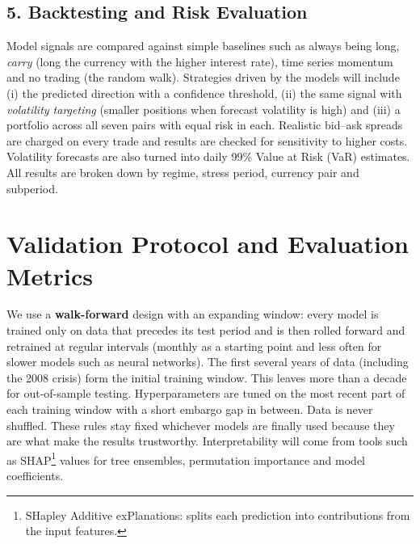 \documentclass[11pt,a4paper]{article}
\begin{document}
\subsection*{5. Backtesting and Risk Evaluation}
Model signals are compared against simple baselines such as always being long, \emph{carry} (long the currency with the higher interest rate), time series momentum and no trading (the random walk). Strategies driven by the models will include (i) the predicted direction with a confidence threshold, (ii) the same signal with \emph{volatility targeting} (smaller positions when forecast volatility is high) and (iii) a portfolio across all seven pairs with equal risk in each. Realistic bid--ask spreads are charged on every trade and results are checked for sensitivity to higher costs. Volatility forecasts are also turned into daily 99\% Value at Risk (VaR) estimates. All results are broken down by regime, stress period, currency pair and subperiod.

\section*{Validation Protocol and Evaluation Metrics}
We use a \textbf{walk-forward} design with an expanding window: every model is trained only on data that precedes its test period and is then rolled forward and retrained at regular intervals (monthly as a starting point and less often for slower models such as neural networks). The first several years of data (including the 2008 crisis) form the initial training window. This leaves more than a decade for out-of-sample testing.
Hyperparameters are tuned on the most recent part of each training window with a short embargo gap in between. Data is never shuffled. These rules stay fixed whichever models are finally used because they are what make the results trustworthy. Interpretability will come from tools such as SHAP\footnote{SHapley Additive exPlanations: splits each prediction into contributions from the input features.} values for tree ensembles, permutation importance and model coefficients.
\end{document}
